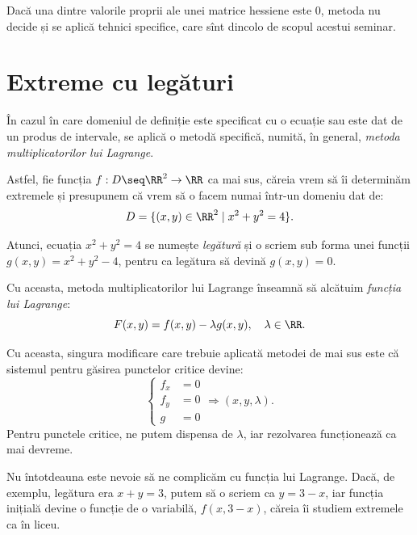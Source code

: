 \begin{remark}\label{rk:lambda-0}
  Dacă una dintre valorile proprii ale unei matrice hessiene este 0, metoda
  nu decide și se aplică tehnici specifice, care sînt dincolo de scopul acestui seminar.
\end{remark}


\section{Extreme cu legături}

În cazul în care domeniul de definiție este specificat cu o ecuație sau este
dat de un produs de intervale, se aplică o metodă specifică, numită, în general,
\emph{metoda multiplicatorilor lui Lagrange}.

Astfel, fie funcția $ f : D \seq \RR^2 \to \RR $ ca mai sus, căreia vrem să îi determinăm
extremele și presupunem că vrem să o facem numai într-un domeniu dat de:
\[
  D = \{ (x, y) \in \RR^2 \mid x^2 + y^2 = 4 \}.
\]

Atunci, ecuația $ x^2 + y^2 = 4 $ se numește \emph{legătură} și o scriem sub
forma unei funcții $ g(x, y) = x^2 + y^2 - 4 $, pentru ca legătura să devină
$ g(x, y) = 0 $.

Cu aceasta, metoda multiplicatorilor lui Lagrange înseamnă să alcătuim
\emph{funcția lui Lagrange}\footnotemark:
\[
  F(x, y) = f(x, y) - \lambda g(x, y), \quad \lambda \in \RR.
\]

Cu aceasta, singura modificare care trebuie aplicată metodei de mai sus este
că sistemul pentru găsirea punctelor critice devine:
\[
  \begin{cases}
    f_x &= 0 \\
    f_y &= 0 \\
    g &= 0
  \end{cases} \Longrightarrow (x, y, \lambda).
\]
Pentru punctele critice, ne putem dispensa de $ \lambda $, iar rezolvarea funcționează
ca mai devreme.

\begin{remark}\label{rk:leg-simpla}
  Nu întotdeauna este nevoie să ne complicăm cu funcția lui Lagrange.
  Dacă, de exemplu, legătura era $ x + y = 3 $, putem să o scriem ca $ y = 3 - x $,
  iar funcția inițială devine o funcție de o variabilă, $ f(x, 3 - x) $,
  căreia îi studiem extremele ca în liceu.
\end{remark}


